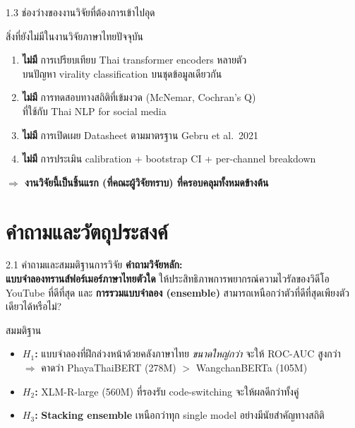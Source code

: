\documentclass[aspectratio=169,11pt,xcolor=dvipsnames]{beamer}
\newcommand{\hl}[1]{\textcolor{kmitlOrange}{\textbf{#1}}}
\newcommand{\hlb}[1]{\textcolor{kmitlBlue}{\textbf{#1}}}
\begin{document}
\begin{frame}{1.3 ช่องว่างของงานวิจัยที่ต้องการเข้าไปอุด}
  \begin{block}{สิ่งที่ยังไม่มีในงานวิจัยภาษาไทยปัจจุบัน}
    \begin{enumerate}
      \item \hlb{ไม่มี} การเปรียบเทียบ Thai transformer encoders หลายตัว\\บนปัญหา virality classification บนชุดข้อมูลเดียวกัน
      \item \hlb{ไม่มี} การทดสอบทางสถิติที่เข้มงวด (McNemar, Cochran's Q)\\ที่ใช้กับ Thai NLP for social media
      \item \hlb{ไม่มี} การเปิดเผย Datasheet ตามมาตรฐาน Gebru et al.\ 2021
      \item \hlb{ไม่มี} การประเมิน calibration + bootstrap CI + per-channel breakdown
    \end{enumerate}
  \end{block}
  \begin{center}
    \large \hl{$\Rightarrow$ งานวิจัยนี้เป็นชิ้นแรก (ที่คณะผู้วิจัยทราบ) ที่ครอบคลุมทั้งหมดข้างต้น}
  \end{center}
\end{frame}

\section{คำถามและวัตถุประสงค์}

\begin{frame}{2.1 คำถามและสมมติฐานการวิจัย}
  \textbf{คำถามวิจัยหลัก:}\\
  \hl{แบบจำลองทรานส์ฟอร์เมอร์ภาษาไทยตัวใด} ให้ประสิทธิภาพการพยากรณ์ความไวรัลของวิดีโอ YouTube ที่ดีที่สุด และ \hl{การรวมแบบจำลอง (ensemble)} สามารถเหนือกว่าตัวที่ดีที่สุดเพียงตัวเดียวได้หรือไม่?
  \vspace{0.6em}
  \begin{block}{สมมติฐาน}
    \begin{itemize}
      \item \textbf{$H_1$:} แบบจำลองที่ฝึกล่วงหน้าด้วยคลังภาษาไทย \emph{ขนาดใหญ่กว่า} จะให้ ROC-AUC สูงกว่า\\
      $\Rightarrow$ คาดว่า PhayaThaiBERT (278M) $>$ WangchanBERTa (105M)
      \item \textbf{$H_2$:} XLM-R-large (560M) ที่รองรับ code-switching จะให้ผลดีกว่าทั้งคู่
      \item \textbf{$H_3$:} \hl{Stacking ensemble} เหนือกว่าทุก single model อย่างมีนัยสำคัญทางสถิติ
    \end{itemize}
  \end{block}
\end{frame}
\end{document}
